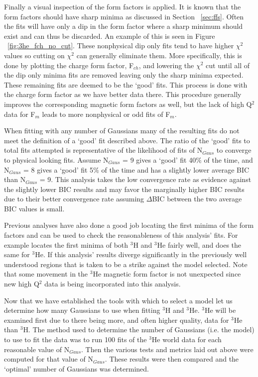 Finally a visual inspection of the form factors is applied. It is known that the form factors should have sharp minima as discussed in Section ~\ref{sec:ffs}. Often the fits will have only a dip in the form factor where a sharp minimum should exist and can thus be discarded. An example of this is seen in Figure ~\ref{fig:3he_fch_no_cut}. These nonphysical dip only fits tend to have higher $\chi^2$ values so cutting on $\chi^2$ can generally eliminate them. More specifically, this is done by plotting the charge form factor, F$_{ch}$, and lowering the $\chi^2$ cut until all of the dip only minima fits are removed leaving only the sharp minima expected. These remaining fits are deemed to be the `good' fits. This process is done with the charge form factor as we have better data there. This procedure generally improves the corresponding magnetic form factors as well, but the lack of high Q$^2$ data for F$_m$ leads to more nonphysical or odd fits of F$_m$.

When fitting with any number of Gaussians many of the resulting fits do not meet the definition of a `good' fit described above. The ratio of the `good' fits to total fits attempted is representative of the likelihood of fits of N$_{Gaus}$ to converge to physical looking fits. Assume N$_{Gaus}$ = 9 gives a `good' fit 40$\%$ of the time, and N$_{Gaus}$ = 8 gives a `good' fit 5$\%$ of the time and has a slightly lower average BIC than N$_{Gaus}$ = 9. This analysis takes the low convergence rate as evidence against the slightly lower BIC results and may favor the marginally higher BIC results due to their better convergence rate assuming $\Delta$BIC between the two average BIC values is small. 

Previous analyses have also done a good job locating the first minima of the form factors and can be used to check the reasonableness of this analysis' fits. For example \cite{Article:Amroun} locates the first minima of both $^3$H and $^3$He fairly well, and \cite{Article:Alex} does the same for $^3$He. If this analysis' results diverge significantly in the previously well understood regions that is taken to be a strike against the model selected. Note that some movement in the $^3$He magnetic form factor is not unexpected since new high Q$^2$ data is being incorporated into this analysis.

Now that we have established the tools with which to select a model let us determine how many Gaussians to use when fitting $^3$H and $^3$He. $^3$He will be examined first due to there being more, and often higher quality, data for $^3$He than $^3$H. The method used to determine the number of Gaussians (i.e. the model) to use to fit the data was to run 100 fits of the $^3$He world data for each reasonable value of N$_{Gaus}$. Then the various tests and metrics laid out above were computed for that value of N$_{Gaus}$. These results were then compared and the `optimal' number of Gaussians was determined.

